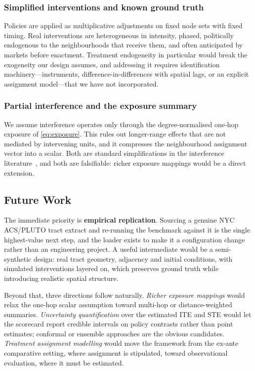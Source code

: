 \subsubsection{Simplified interventions and known ground truth}

Policies are applied as multiplicative adjustments on fixed node sets with
fixed timing. Real interventions are heterogeneous in intensity, phased,
politically endogenous to the neighbourhoods that receive them, and often
anticipated by markets before enactment. Treatment endogeneity in particular
would break the exogeneity our design assumes, and addressing it requires
identification machinery---instruments, difference-in-differences with spatial
lags, or an explicit assignment model---that we have not incorporated.

\subsubsection{Partial interference and the exposure summary}

We assume interference operates only through the degree-normalised
one-hop exposure of \eqref{eq:exposure}. This rules out longer-range effects
that are not mediated by intervening units, and it compresses the neighbourhood
assignment vector into a scalar. Both are standard simplifications in the
interference literature~\cite{hudgens2008,forastiere2021}, and both are
falsifiable: richer exposure mappings would be a direct extension.

\subsection{Future Work}

The immediate priority is \textbf{empirical replication}. Sourcing a genuine
NYC ACS/PLUTO tract extract and re-running the benchmark against it is the
single highest-value next step, and the loader exists to make it a
configuration change rather than an engineering project. A useful intermediate
would be a semi-synthetic design: real tract geometry, adjacency and initial
conditions, with simulated interventions layered on, which preserves ground
truth while introducing realistic spatial structure.

Beyond that, three directions follow naturally. \emph{Richer exposure
mappings} would relax the one-hop scalar assumption toward multi-hop or
distance-weighted summaries. \emph{Uncertainty quantification} over the
estimated ITE and STE would let the scorecard report credible intervals on
policy contrasts rather than point estimates; conformal or ensemble approaches
are the obvious candidates. \emph{Treatment assignment modelling} would move
the framework from the ex-ante comparative setting, where assignment is
stipulated, toward observational evaluation, where it must be estimated.


